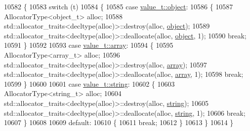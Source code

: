 \begin{DoxyCode}
10582         \{
10583             \textcolor{keywordflow}{switch} (t)
10584             \{
10585                 \textcolor{keywordflow}{case} \hyperlink{namespacenlohmann_1_1detail_a1ed8fc6239da25abcaf681d30ace4985aa8cfde6331bd59eb2ac96f8911c4b666}{value\_t::object}:
10586                 \{
10587                     AllocatorType<object\_t> alloc;
10588                     std::allocator\_traits<decltype(alloc)>::destroy(alloc, 
      \hyperlink{unionnlohmann_1_1basic__json_1_1json__value_a4a2209bb26e7088cd36bf24824ab5521}{object});
10589                     std::allocator\_traits<decltype(alloc)>::deallocate(alloc, 
      \hyperlink{unionnlohmann_1_1basic__json_1_1json__value_a4a2209bb26e7088cd36bf24824ab5521}{object}, 1);
10590                     \textcolor{keywordflow}{break};
10591                 \}
10592 
10593                 \textcolor{keywordflow}{case} \hyperlink{namespacenlohmann_1_1detail_a1ed8fc6239da25abcaf681d30ace4985af1f713c9e000f5d3f280adbd124df4f5}{value\_t::array}:
10594                 \{
10595                     AllocatorType<array\_t> alloc;
10596                     std::allocator\_traits<decltype(alloc)>::destroy(alloc, \hyperlink{unionnlohmann_1_1basic__json_1_1json__value_a7947687f3ae1911d6e9847e2b3226157}{array});
10597                     std::allocator\_traits<decltype(alloc)>::deallocate(alloc, 
      \hyperlink{unionnlohmann_1_1basic__json_1_1json__value_a7947687f3ae1911d6e9847e2b3226157}{array}, 1);
10598                     \textcolor{keywordflow}{break};
10599                 \}
10600 
10601                 \textcolor{keywordflow}{case} \hyperlink{namespacenlohmann_1_1detail_a1ed8fc6239da25abcaf681d30ace4985ab45cffe084dd3d20d928bee85e7b0f21}{value\_t::string}:
10602                 \{
10603                     AllocatorType<string\_t> alloc;
10604                     std::allocator\_traits<decltype(alloc)>::destroy(alloc, 
      \hyperlink{unionnlohmann_1_1basic__json_1_1json__value_a9856fb4271b50d738e14c5a9a2f05118}{string});
10605                     std::allocator\_traits<decltype(alloc)>::deallocate(alloc, 
      \hyperlink{unionnlohmann_1_1basic__json_1_1json__value_a9856fb4271b50d738e14c5a9a2f05118}{string}, 1);
10606                     \textcolor{keywordflow}{break};
10607                 \}
10608 
10609                 \textcolor{keywordflow}{default}:
10610                 \{
10611                     \textcolor{keywordflow}{break};
10612                 \}
10613             \}
10614         \}
\end{DoxyCode}


